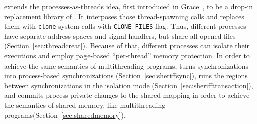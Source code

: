 \label{sec:sheriffframework}


%

\sheriff{} extends the processes-as-threads idea, first introduced in Grace~\cite{grace}, to be a drop-in replacement library of \pthreads{}. It interposes those thread-spawning calls and replaces them with \texttt{clone} system calls with \texttt{CLONE\_FILES} flag. Thus, different processes have separate address spaces and signal handlers, but share all opened files (Section~\ref{sec:threadcreat}). Because of that, different processes can isolate their executions and employ page-based ``per-thread'' memory protection. In order to achieve the same semantics of multithreading programs, \sheriff{} turns synchronizations into process-based synchronizations (Section~\ref{sec:sheriffsync}), runs the regions between synchronizations in the isolation mode (Section~\ref{sec:sherifftransaction}), and commits process-private changes to the shared mapping in order to achieve the  semantics of shared memory, like multithreading programs(Section~\ref{sec:sharedmemory}). 

